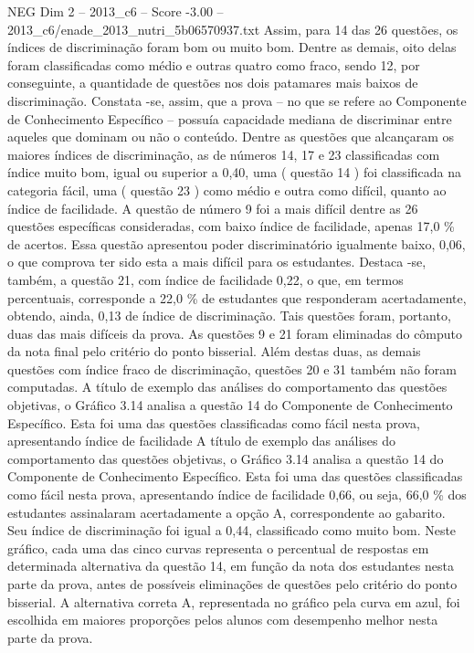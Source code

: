 \begin{textsample}{NEG Dim 2 – 2013\_c6 – Score -3.00 – 2013\_c6/enade\_2013\_nutri\_5b06570937.txt}
Assim, para 14 das 26 questões, os índices de discriminação foram bom ou muito bom.
Dentre as demais, oito delas foram classificadas como médio e outras quatro como fraco, sendo 12, por conseguinte, a quantidade de questões nos dois patamares mais baixos de discriminação.
Constata -se, assim, que a prova – no que se refere ao Componente de Conhecimento Específico – possuía capacidade mediana de discriminar entre aqueles que dominam ou não o conteúdo.
Dentre as questões que alcançaram os maiores índices de discriminação, as de números 14, 17 e 23 classificadas com índice muito bom, igual ou superior a 0,40, uma ( questão 14 ) foi classificada na categoria fácil, uma ( questão 23 ) como médio e outra como difícil, quanto ao índice de facilidade.
A questão de número 9 foi a mais difícil dentre as 26 questões específicas consideradas, com baixo índice de facilidade, apenas 17,0 \% de acertos.
Essa questão apresentou poder discriminatório igualmente baixo, 0,06, o que comprova ter sido esta a mais difícil para os estudantes.
Destaca -se, também, a questão 21, com índice de facilidade 0,22, o que, em termos percentuais, corresponde a 22,0 \% de estudantes que responderam acertadamente, obtendo, ainda, 0,13 de índice de discriminação.
Tais questões foram, portanto, duas das mais difíceis da prova.
As questões 9 e 21 foram eliminadas do cômputo da nota final pelo critério do ponto bisserial.
Além destas duas, as demais questões com índice fraco de discriminação, questões 20 e 31 também não foram computadas.
A título de exemplo das análises do comportamento das questões objetivas, o Gráfico 3.14 analisa a questão 14 do Componente de Conhecimento Específico.
Esta foi uma das questões classificadas como fácil nesta prova, apresentando índice de facilidade A título de exemplo das análises do comportamento das questões objetivas, o Gráfico 3.14 analisa a questão 14 do Componente de Conhecimento Específico.
Esta foi uma das questões classificadas como fácil nesta prova, apresentando índice de facilidade 0,66, ou seja, 66,0 \% dos estudantes assinalaram acertadamente a opção A, correspondente ao gabarito.
Seu índice de discriminação foi igual a 0,44, classificado como muito bom.
Neste gráfico, cada uma das cinco curvas representa o percentual de respostas em determinada alternativa da questão 14, em função da nota dos estudantes nesta parte da prova, antes de possíveis eliminações de questões pelo critério do ponto bisserial.
A alternativa correta A, representada no gráfico pela curva em azul, foi escolhida em maiores proporções pelos alunos com desempenho melhor nesta parte da prova.

\end{textsample}
